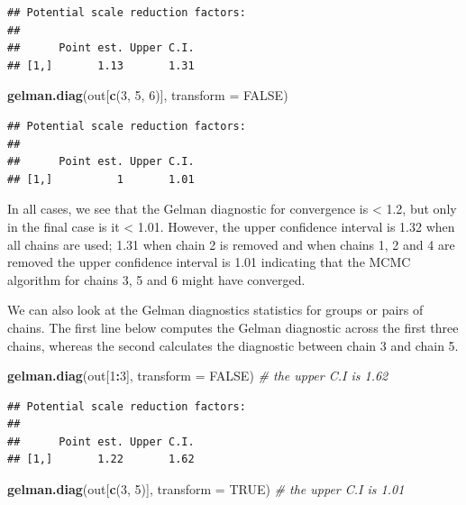 \documentclass[
]{article}
\newenvironment{Shaded}{\begin{snugshade}}{\end{snugshade}}
\newcommand{\CommentTok}[1]{\textcolor[rgb]{0.56,0.35,0.01}{\textit{#1}}}
\newcommand{\DataTypeTok}[1]{\textcolor[rgb]{0.13,0.29,0.53}{#1}}
\newcommand{\DecValTok}[1]{\textcolor[rgb]{0.00,0.00,0.81}{#1}}
\newcommand{\KeywordTok}[1]{\textcolor[rgb]{0.13,0.29,0.53}{\textbf{#1}}}
\newcommand{\NormalTok}[1]{#1}
\newcommand{\OperatorTok}[1]{\textcolor[rgb]{0.81,0.36,0.00}{\textbf{#1}}}
\newcommand{\OtherTok}[1]{\textcolor[rgb]{0.56,0.35,0.01}{#1}}
\begin{document}
\begin{verbatim}
## Potential scale reduction factors:
## 
##      Point est. Upper C.I.
## [1,]       1.13       1.31
\end{verbatim}

\begin{Shaded}
\begin{Highlighting}[]
\KeywordTok{gelman.diag}\NormalTok{(out[}\KeywordTok{c}\NormalTok{(}\DecValTok{3}\NormalTok{, }\DecValTok{5}\NormalTok{, }\DecValTok{6}\NormalTok{)], }\DataTypeTok{transform =} \OtherTok{FALSE}\NormalTok{)}
\end{Highlighting}
\end{Shaded}

\begin{verbatim}
## Potential scale reduction factors:
## 
##      Point est. Upper C.I.
## [1,]          1       1.01
\end{verbatim}

In all cases, we see that the Gelman diagnostic for convergence is
\textless{} 1.2, but only in the final case is it \textless{} 1.01.
However, the upper confidence interval is 1.32 when all chains are used;
1.31 when chain 2 is removed and when chains 1, 2 and 4 are removed the
upper confidence interval is 1.01 indicating that the MCMC algorithm for
chains 3, 5 and 6 might have converged.

We can also look at the Gelman diagnostics statistics for groups or
pairs of chains. The first line below computes the Gelman diagnostic
across the first three chains, whereas the second calculates the
diagnostic between chain 3 and chain 5.

\begin{Shaded}
\begin{Highlighting}[]
\KeywordTok{gelman.diag}\NormalTok{(out[}\DecValTok{1}\OperatorTok{:}\DecValTok{3}\NormalTok{], }\DataTypeTok{transform =} \OtherTok{FALSE}\NormalTok{) }\CommentTok{# the upper C.I is 1.62}
\end{Highlighting}
\end{Shaded}

\begin{verbatim}
## Potential scale reduction factors:
## 
##      Point est. Upper C.I.
## [1,]       1.22       1.62
\end{verbatim}

\begin{Shaded}
\begin{Highlighting}[]
\KeywordTok{gelman.diag}\NormalTok{(out[}\KeywordTok{c}\NormalTok{(}\DecValTok{3}\NormalTok{, }\DecValTok{5}\NormalTok{)], }\DataTypeTok{transform =} \OtherTok{TRUE}\NormalTok{) }\CommentTok{# the upper C.I is 1.01}
\end{Highlighting}
\end{Shaded}
\end{document}
